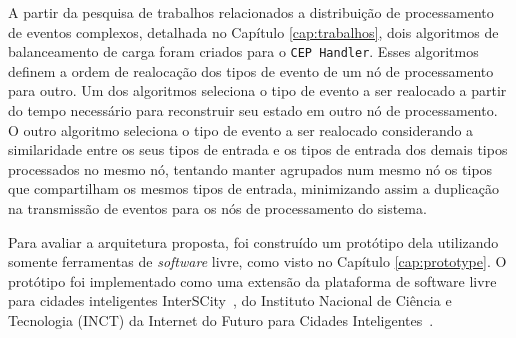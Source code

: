 
A partir da pesquisa de trabalhos relacionados a distribuição de processamento de eventos complexos, detalhada no Capítulo \ref{cap:trabalhos}, dois algoritmos de balanceamento de carga foram criados para o \texttt{CEP Handler}. Esses algoritmos definem a ordem de realocação dos tipos de evento de um nó de processamento para outro. Um dos algoritmos seleciona o tipo de evento a ser realocado a partir do tempo necessário para reconstruir seu estado em outro nó de processamento. O outro algoritmo seleciona o tipo de evento a ser realocado considerando a similaridade entre os seus tipos de entrada e os tipos de entrada dos demais tipos processados no mesmo nó, tentando manter agrupados num mesmo nó os tipos que compartilham os mesmos tipos de entrada, minimizando assim a duplicação na transmissão de eventos para os nós de processamento do sistema.

Para avaliar a arquitetura proposta, foi construído um protótipo dela utilizando somente ferramentas de \textit{software} livre, como visto no Capítulo \ref{cap:prototype}. O protótipo foi implementado como uma extensão da plataforma de software livre para cidades inteligentes InterSCity~\citep{del2019design}, do Instituto Nacional de Ciência e Tecnologia (INCT) da Internet do Futuro para Cidades Inteligentes~\citep{Interscitysite}.




